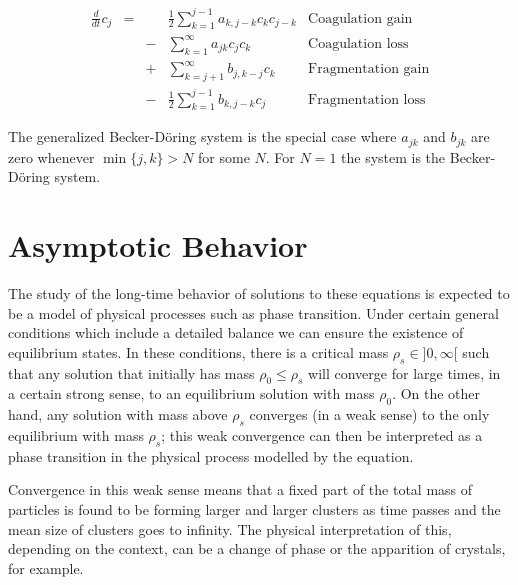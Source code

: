 \documentclass{article}
\begin{document}
\begin{multicols}{2}

\vspace{.2cm}

\noindent
\colorbox{marronrp3}{
  \begin{minipage}[t]{.96\linewidth}
    \Large
    \begin{align*}
      \frac{d}{dt} c_j
      & = &&  \frac{1}{2} \sum_{k=1}^{j-1} a_{k,j-k}  c_k c_{j-k}
      &  \text{Coagulation gain}\\
      && - &\sum_{k=1}^{\infty} a_{jk} c_j c_k
      &   \text{Coagulation loss}\\
      && + &\sum_{k=j+1}^{\infty} b_{j,k-j} c_k
      &   \text{Fragmentation gain}\\
      && - &\frac{1}{2} \sum_{k=1}^{j-1} b_{k,j-k} c_j
      & \text{Fragmentation loss}
    \end{align*}
    \vspace{.02cm}
  \end{minipage}
}
\vspace{.4cm}

{\textcolor{rojo}{The generalized Becker-Döring system is the special
    case where $a_{jk}$ and $b_{jk}$ are zero whenever $\min\{j,k\} >
    N$ for some $N$. For $N=1$ the system is the Becker-Döring
    system.}  }

\section*{Asymptotic Behavior}

The study of the long-time behavior of solutions to these equations is
expected to be a model of physical processes such as phase transition.
Under certain general conditions which include a detailed balance we
can ensure the existence of equilibrium states. In these conditions,
there is a critical mass $\rho_s \in ]0,\infty[$ such that any
solution that initially has mass $\rho_0 \leq \rho_s$ will converge
for large times, in a certain strong sense, to an equilibrium solution
with mass $\rho_0$. On the other hand, any solution with mass above
$\rho_s$ converges (in a weak sense) to the only equilibrium with mass
$\rho_s$; this weak convergence can then be interpreted as a phase
transition in the physical process modelled by the equation.

Convergence in this weak sense means that a fixed part of the total
mass of particles is found to be forming larger and larger clusters as
time passes and the mean size of clusters goes to infinity. The
physical interpretation of this, depending on the context, can be a
change of phase or the apparition of crystals, for example.


\end{multicols}
\end{document}
